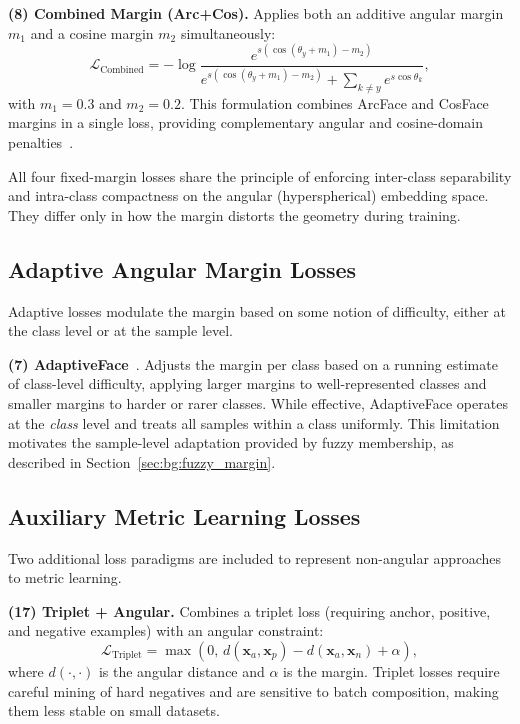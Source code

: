 \textbf{(8) Combined Margin (Arc+Cos).}
Applies both an additive angular margin $m_1$ and a cosine margin $m_2$ simultaneously:
\begin{equation}
\label{eq:combined}
\mathcal{L}_{\text{Combined}} = -\log \frac{e^{s (\cos(\theta_y + m_1) - m_2)}}{e^{s (\cos(\theta_y + m_1) - m_2)} + \sum_{k \neq y} e^{s \cos\theta_k}},
\end{equation}
with $m_1 = 0.3$ and $m_2 = 0.2$.
This formulation combines ArcFace and CosFace margins in a single loss, providing complementary angular and cosine-domain penalties~\cite{deng2019arcface}.

All four fixed-margin losses share the principle of enforcing inter-class separability and intra-class compactness on the angular (hyperspherical) embedding space.
They differ only in how the margin distorts the geometry during training.


\subsection{Adaptive Angular Margin Losses}
\label{sec:bg:adaptive_margins}

Adaptive losses modulate the margin based on some notion of difficulty, either at the class level or at the sample level.

\textbf{(7) AdaptiveFace}~\cite{liu2019adaptiveface}.
Adjusts the margin per class based on a running estimate of class-level difficulty, applying larger margins to well-represented classes and smaller margins to harder or rarer classes.
While effective, AdaptiveFace operates at the \emph{class} level and treats all samples within a class uniformly.
This limitation motivates the sample-level adaptation provided by fuzzy membership, as described in Section~\ref{sec:bg:fuzzy_margin}.


\subsection{Auxiliary Metric Learning Losses}
\label{sec:bg:auxiliary_losses}

Two additional loss paradigms are included to represent non-angular approaches to metric learning.

\textbf{(17) Triplet + Angular.}
Combines a triplet loss (requiring anchor, positive, and negative examples) with an angular constraint:
\begin{equation}
\label{eq:triplet_angular}
\mathcal{L}_{\text{Triplet}} = \max\left(0, \,d(\mathbf{x}_a, \mathbf{x}_p) - d(\mathbf{x}_a, \mathbf{x}_n) + \alpha\right),
\end{equation}
where $d(\cdot, \cdot)$ is the angular distance and $\alpha$ is the margin.
Triplet losses require careful mining of hard negatives and are sensitive to batch composition, making them less stable on small datasets.

